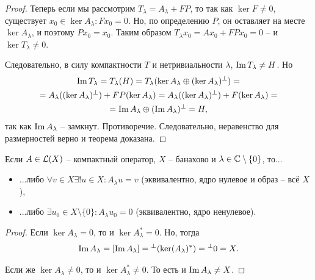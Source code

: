 \begin{proof}
    Теперь если мы рассмотрим $T_\lambda = A_\lambda + FP$, то так как $\ker F \neq 0$, существует $x_0 \in \ker A_\lambda\colon Fx_0 = 0$.
    Но, по определению $P$, он оставляет на месте $\ker A_\lambda$, и поэтому $Px_0 = x_0$.
    Таким образом $T_\lambda x_0 = Ax_0 + FPx_0 = 0$ -- и $\ker T_\lambda \neq 0$.

    Следовательно, в силу компактности $T$ и нетривиальности $\lambda$, $\operatorname{Im} T_\lambda \neq H$.
    Но
    \begin{multline*}
        \operatorname{Im} T_\lambda = T_\lambda(H) = T_\lambda (\ker A_\lambda \oplus (\ker A_\lambda)^\perp) = \\ = A_\lambda((\ker A_\lambda)^\perp) + FP(\ker A_\lambda) = A_\lambda ((\ker A_\lambda)^\perp) + F(\ker A_\lambda) = \\ = \operatorname{Im} A_\lambda \oplus (\operatorname{Im} A_\lambda)^\perp = H,
    \end{multline*}
    так как $\operatorname{Im} A_\lambda$ -- замкнут. 
    Противоречие.
    Следовательно, неравенство для размерностей верно и теорема доказана.
\end{proof}

\begin{corollary}
    Если $A \in \mathcal{L}(X)$ -- компактный оператор, $X$ -- банахово и $\lambda \in \mathbb{C} \setminus \{0\}$, то...
    \begin{itemize}
        \item ...либо $\forall v \in X \exists! u \in X\colon A_\lambda u = v$ (эквивалентно, ядро нулевое и образ -- всё $X$),
        \item ...либо $\exists u_0 \in X \setminus \{0\}\colon A_\lambda u_0 = 0$ (эквивалентно, ядро ненулевое).
    \end{itemize}
\end{corollary}
\begin{proof}
    Если $\ker A_\lambda = 0$, то и $\ker A_\lambda^* = 0$.
    Но, тогда
    \[
        \operatorname{Im} A_\lambda = [\operatorname{Im} A_\lambda] = {}^\perp (\ker (A_\lambda)^*) = {}^\perp 0 = X.
    \]

    Если же $\ker A_\lambda \neq 0$, то и $\ker A_\lambda^* \neq 0$.
    То есть и $\operatorname{Im} A_\lambda \neq X$.
\end{proof}

